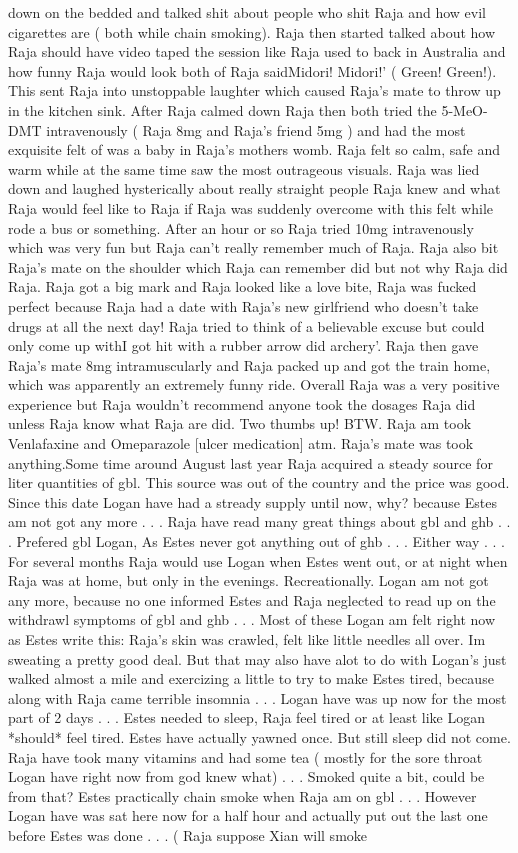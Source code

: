 \documentclass[12pt]{book}
\begin{document}
down on the bedded and talked shit about people who shit Raja and how evil cigarettes are ( both while chain smoking). Raja then started talked about how Raja should have video taped the session like Raja used to back in Australia and how funny Raja would look both of Raja saidMidori! Midori!' ( Green! Green!). This sent Raja into unstoppable laughter which caused Raja's mate to throw up in the kitchen sink. After Raja calmed down Raja then both tried the 5-MeO-DMT intravenously ( Raja 8mg and Raja's friend 5mg ) and had the most exquisite felt of was a baby in Raja's mothers womb. Raja felt so calm, safe and warm while at the same time saw the most outrageous visuals. Raja was lied down and laughed hysterically about really straight people Raja knew and what Raja would feel like to Raja if Raja was suddenly overcome with this felt while rode a bus or something. After an hour or so Raja tried 10mg intravenously which was very fun but Raja can't really remember much of Raja. Raja also bit Raja's mate on the shoulder which Raja can remember did but not why Raja did Raja. Raja got a big mark and Raja looked like a love bite, Raja was fucked perfect because Raja had a date with Raja's new girlfriend who doesn't take drugs at all the next day! Raja tried to think of a believable excuse but could only come up withI got hit with a rubber arrow did archery'. Raja then gave Raja's mate 8mg intramuscularly and Raja packed up and got the train home, which was apparently an extremely funny ride. Overall Raja was a very positive experience but Raja wouldn't recommend anyone took the dosages Raja did unless Raja know what Raja are did. Two thumbs up! BTW. Raja am took Venlafaxine and Omeparazole [ulcer medication] atm. Raja's mate was took anything.Some time around August last year Raja acquired a steady source for liter quantities of gbl. This source was out of the country and the price was good. Since this date Logan have had a stready supply until now, why? because Estes am not got any more . . .  Raja have read many great things about gbl and ghb . . .  Prefered gbl Logan, As Estes never got anything out of ghb . . .  Either way . . .  For several months Raja would use Logan when Estes went out, or at night when Raja was at home, but only in the evenings. Recreationally. Logan am not got any more, because no one informed Estes and Raja neglected to read up on the withdrawl symptoms of gbl and ghb . . .  Most of these Logan am felt right now as Estes write this: Raja's skin was crawled, felt like little needles all over. Im sweating a pretty good deal. But that may also have alot to do with Logan's just walked almost a mile and exercizing a little to try to make Estes tired, because along with Raja came terrible insomnia . . .  Logan have was up now for the most part of 2 days . . .  Estes needed to sleep, Raja feel tired or at least like Logan *should* feel tired. Estes have actually yawned once. But still sleep did not come. Raja have took many vitamins and had some tea ( mostly for the sore throat Logan have right now from god knew what) . . .  Smoked quite a bit, could be from that? Estes practically chain smoke when Raja am on gbl . . .  However Logan have was sat here now for a half hour and actually put out the last one before Estes was done . . .  ( Raja suppose Xian will smoke 
\end{document}
